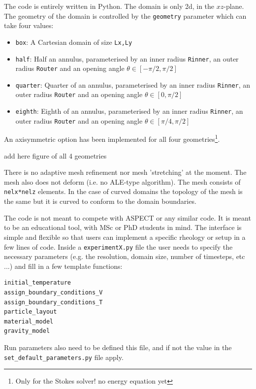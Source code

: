 \documentclass[a4paper,12pt]{article}
\begin{document}
The code is entirely written in Python. The domain is only 2d, in the $xz$-plane.
The geometry of the domain is controlled by the \lstinline{geometry}
parameter which can take four values:
\begin{itemize}
\item \lstinline{box}: A Cartesian domain of size \lstinline{Lx,Ly}
\item \lstinline{half}: 
Half an annulus, parameterised by an inner radius \lstinline{Rinner}, an
outer radius \lstinline{Router} and an opening angle $\theta\in[-\pi/2,\pi/2]$
\item \lstinline{quarter}: Quarter of an annulus, parameterised by an inner radius \lstinline{Rinner}, an
outer radius \lstinline{Router} and an opening angle $\theta\in[0,\pi/2]$
\item \lstinline{eighth}: Eighth of an annulus, parameterised by an inner radius \lstinline{Rinner}, an
outer radius \lstinline{Router} and an opening angle $\theta\in[\pi/4,\pi/2]$
\end{itemize}
An axisymmetric option has been implemented for all four geometries\footnote{Only for the Stokes solver!
no energy equation yet}.

{\color{red} add here figure of all 4 geometries}

There is no adaptive mesh refinement nor mesh 'stretching' at the moment. 
The mesh also does not deform (i.e. no ALE-type algorithm).
The mesh consists of \lstinline{nelx*nelz} elements. In the case of curved domains 
the topology of the mesh is the same but it is curved to conform to the domain boundaries.

The code is not meant to compete with ASPECT or any similar code. It is 
meant to be an educational tool, with MSc or PhD students in mind. 
The interface is simple and flexible so that users can implement
a specific rheology or setup in a few lines of code. 
Inside a \lstinline{experimentX.py} file the user needs to specify the 
necessary parameters (e.g. the resolution, domain size, number of timesteps, etc ...)
and fill in a few template functions:
\begin{lstlisting}  
initial_temperature
assign_boundary_conditions_V
assign_boundary_conditions_T
particle_layout
material_model
gravity_model
\end{lstlisting}  
Run parameters also need to be defined this file, and if not the value in the 
{\tt set\_default\_parameters.py} file apply. 
\end{document}
